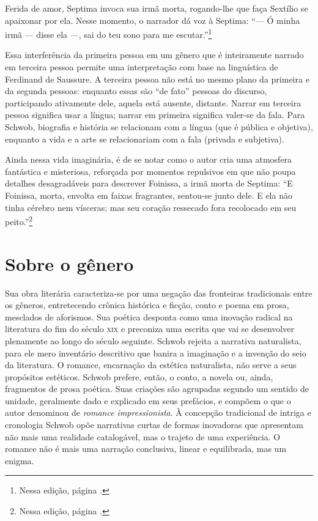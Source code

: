 Ferida de amor, Septima invoca sua irmã morta, rogando-lhe que faça
Sextílio se apaixonar por ela. Nesse momento, o narrador dá voz à
Septima: ``--- Ó minha irmã --- disse ela ---, sai do teu sono para me escutar.''\footnote{Nessa edição, página \pageref{irma}.}

Essa interferência da primeira pessoa em um gênero que é inteiramente
narrado em terceira pessoa permite uma interpretação com base na
linguística de Ferdinand de Saussure. A terceira pessoa não está no
mesmo plano da primeira e da segunda pessoas: enquanto essas são ``de
fato'' pessoas do discurso, participando ativamente dele, aquela está
ausente, distante. Narrar em terceira pessoa significa usar a língua;
narrar em primeira significa valer-se da fala. Para Schwob, biografia e
história se relacionam com a língua (que é pública e objetiva), enquanto
a vida e a arte se relacionariam com a fala (privada e subjetiva).

Ainda nessa vida imaginária, é de se notar como o autor cria uma
atmosfera fantástica e misteriosa, reforçada por momentos repulsivos em
que não poupa detalhes desagradáveis para descrever Foinissa, a irmã
morta de Septima: ``E Foinissa, morta, envolta em faixas fragrantes, sentou-se junto dele.
E ela não tinha cérebro nem vísceras; mas seu coração ressecado fora
recolocado em seu peito.''\footnote{Nessa edição, página \pageref{viscera}.}


\section{Sobre o gênero}

Sua obra literária caracteriza-se por uma negação das fronteiras
tradicionais entre os gêneros, entretecendo crônica histórica e ficção, conto e
poema em prosa, mesclados de aforismos. Sua poética desponta como uma inovação
radical na literatura do fim do século \textsc{xix} e preconiza uma escrita que vai se
desenvolver plenamente ao longo do século seguinte. Schwob rejeita a narrativa
naturalista, para ele mero inventário descritivo que banira a imaginação e a
invenção do seio da literatura. O romance, encarnação da estética naturalista,
não serve a seus propósitos estéticos. Schwob prefere, então, o conto, a novela
ou, ainda, fragmentos de prosa poética. Suas criações são agrupadas segundo um
sentido de unidade, geralmente dado e explicado em seus prefácios, e compõem o
que o autor denominou de \textit{romance impressionista}. À concepção
tradicional de intriga e cronologia Schwob opõe narrativas curtas de formas
inovadoras que apresentam não mais uma realidade catalogável, mas o trajeto de
uma experiência. O romance não é mais uma narração conclusiva, linear e
equilibrada, mas um enigma.

